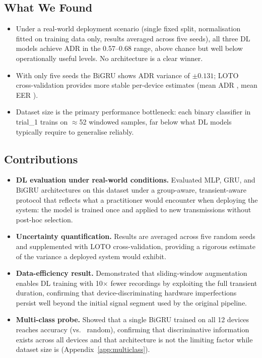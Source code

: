\subsection*{What We Found}
\begin{itemize}
  \item Under a real-world deployment scenario (single fixed split, normalisation fitted on training data only, results averaged across five seeds), all three DL models achieve ADR in the 0.57--0.68 range, above chance but well below operationally useful levels. No architecture is a clear winner.
  \item With only five seeds the BiGRU shows ADR variance of $\pm 0.131$;
        LOTO cross-validation provides more stable per-device estimates
        (mean ADR \bigruLOTOadrMean, mean EER \bigruLOTOeerMean).
  \item Dataset size is the primary performance bottleneck: each binary
        classifier in trial\_1 trains on $\approx$52 windowed samples,
        far below what DL models typically require to generalise reliably.
\end{itemize}

\subsection*{Contributions}
\begin{itemize}
  \item \textbf{DL evaluation under real-world conditions.} Evaluated MLP, GRU, and BiGRU architectures on this dataset under a group-aware, transient-aware protocol that reflects what a practitioner would encounter when deploying the system: the model is trained once and applied to new transmissions without post-hoc selection.
  \item \textbf{Uncertainty quantification.} Results are averaged across five random seeds and supplemented with LOTO cross-validation, providing a rigorous estimate of the variance a deployed system would exhibit.
  \item \textbf{Data-efficiency result.} Demonstrated that sliding-window augmentation enables DL training with 10$\times$ fewer recordings by exploiting the full transient duration, confirming that device-discriminating hardware imperfections persist well beyond the initial signal segment used by the original pipeline.
  \item \textbf{Multi-class probe.} Showed that a single BiGRU trained on all 12 devices reaches \mcAccuracy{} accuracy (vs.\ \mcRandomBaseline{} random), confirming that discriminative information exists across all devices and that architecture is not the limiting factor while dataset size is (Appendix~\ref{app:multiclass}).
\end{itemize}


